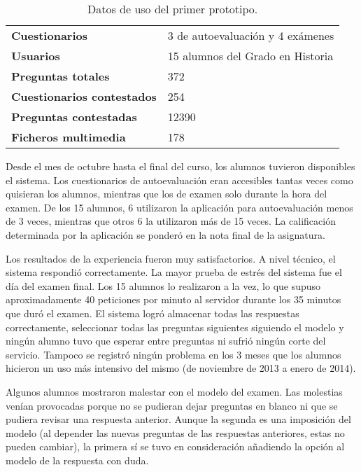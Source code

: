 \begin{table}[hc]
	\centering
	\begin{tabular}{l|l}
		{\bf Cuestionarios}             & 3 de autoevaluación y 4 exámenes \\ 
		{\bf Usuarios}                  & 15 alumnos del Grado en Historia \\
		{\bf Preguntas totales}         & 372                              \\ 
		{\bf Cuestionarios contestados} & 254                              \\ 
		{\bf Preguntas contestadas}     & 12390                            \\ 
		{\bf Ficheros multimedia}		& 178							   \\
	\end{tabular}
	\caption{Datos de uso del primer prototipo.}
\end{table}

Desde el mes de octubre hasta el final del curso, los alumnos tuvieron disponibles el sistema. Los cuestionarios de autoevaluación eran accesibles tantas veces como quisieran los alumnos, mientras que los de examen solo durante la hora del examen. De los 15 alumnos, 6 utilizaron la aplicación para autoevaluación menos de 3 veces, mientras que otros 6 la utilizaron más de 15 veces. La calificación determinada por la aplicación se ponderó en la nota final de la asignatura.

Los resultados de la experiencia fueron muy satisfactorios. A nivel técnico, el sistema respondió correctamente. La mayor prueba de estrés del sistema fue el día del examen final. Los 15 alumnos lo realizaron a la vez, lo que supuso aproximadamente 40 peticiones por minuto al servidor durante los 35 minutos que duró el examen. El sistema logró almacenar todas las respuestas correctamente, seleccionar todas las preguntas siguientes siguiendo el modelo y ningún alumno tuvo que esperar entre preguntas ni sufrió ningún corte del servicio. Tampoco se registró ningún problema en los 3 meses que los alumnos hicieron un uso más intensivo del mismo (de noviembre de 2013 a enero de 2014).

Algunos alumnos mostraron malestar con el modelo del examen. Las molestias venían provocadas porque no se pudieran dejar preguntas en blanco ni que se pudiera revisar una respuesta anterior. Aunque la segunda es una imposición del modelo (al depender las nuevas preguntas de las respuestas anteriores, estas no pueden cambiar), la primera sí se tuvo en consideración añadiendo la opción al modelo de la respuesta con duda.

